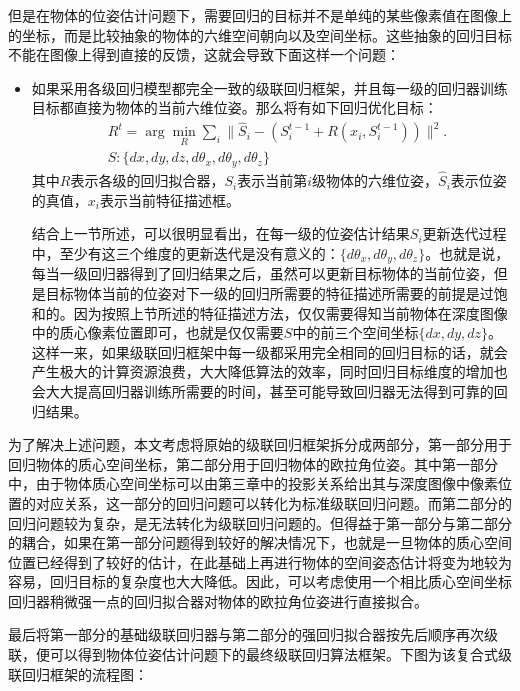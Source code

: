 但是在物体的位姿估计问题下，需要回归的目标并不是单纯的某些像素值在图像上的坐标，而是比较抽象的物体的六维空间朝向以及空间坐标。这些抽象的回归目标不能在图像上得到直接的反馈，这就会导致下面这样一个问题：
\begin{itemize}
\item 如果采用各级回归模型都完全一致的级联回归框架，并且每一级的回归器训练目标都直接为物体的当前六维位姿。那么将有如下回归优化目标：
\begin{equation}
\begin{aligned}
	& R^t=\arg \min_R \sum_i \|\hat{S}_i-(S_i^{t-1}+R(x_i,S_i^{t-1}))\|^2. \\
	& S:\{dx,dy,dz,d\theta_x,d\theta_y,d\theta_z\}
\end{aligned}
\end{equation}
其中$R$表示各级的回归拟合器，$S_i$表示当前第$i$级物体的六维位姿，$\hat{S}_i$表示位姿的真值，$x_i$表示当前特征描述框。

结合上一节所述，可以很明显看出，在每一级的位姿估计结果$S_i$更新迭代过程中，至少有这三个维度的更新迭代是没有意义的：$\{d\theta_x,d\theta_y,d\theta_z\}$。也就是说，每当一级回归器得到了回归结果之后，虽然可以更新目标物体的当前位姿，但是目标物体当前的位姿对下一级的回归所需要的特征描述所需要的前提是过饱和的。因为按照上节所述的特征描述方法，仅仅需要得知当前物体在深度图像中的质心像素位置即可，也就是仅仅需要$S$中的前三个空间坐标$\{dx,dy,dz\}$。这样一来，如果级联回归框架中每一级都采用完全相同的回归目标的话，就会产生极大的计算资源浪费，大大降低算法的效率，同时回归目标维度的增加也会大大提高回归器训练所需要的时间，甚至可能导致回归器无法得到可靠的回归结果。
\end{itemize}

为了解决上述问题，本文考虑将原始的级联回归框架拆分成两部分，第一部分用于回归物体的质心空间坐标，第二部分用于回归物体的欧拉角位姿。其中第一部分中，由于物体质心空间坐标可以由第三章中的投影关系给出其与深度图像中像素位置的对应关系，这一部分的回归问题可以转化为标准级联回归问题。而第二部分的回归问题较为复杂，是无法转化为级联回归问题的。但得益于第一部分与第二部分的耦合，如果在第一部分问题得到较好的解决情况下，也就是一旦物体的质心空间位置已经得到了较好的估计，在此基础上再进行物体的空间姿态估计将变为地较为容易，回归目标的复杂度也大大降低。因此，可以考虑使用一个相比质心空间坐标回归器稍微强一点的回归拟合器对物体的欧拉角位姿进行直接拟合。

最后将第一部分的基础级联回归器与第二部分的强回归拟合器按先后顺序再次级联，便可以得到物体位姿估计问题下的最终级联回归算法框架。下图为该复合式级联回归框架的流程图：

